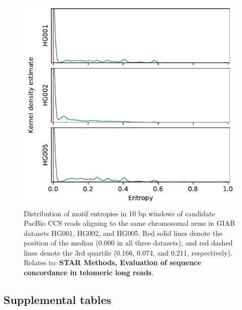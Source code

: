 \documentclass{article}
\begin{document}
\begin{figure}[ht!] \centering
\includegraphics[height=.95\textheight,width=.65\textwidth,keepaspectratio]{figures/entropy.pdf}
\caption{
    Distribution of motif entropies in 10 bp windows of candidate PacBio CCS reads aligning to the same chromosomal arms in GIAB datasets HG001, HG002, and HG005.
    Red solid lines denote the position of the median (0.000 in all three datasets), and red dashed lines denote the 3rd quartile (0.166, 0.074, and 0.211, respectively).
    Relates to: \textbf{STAR Methods, Evaluation of sequence concordance in telomeric long reads}.
}
\label{fig:entropy}
\end{figure}
\clearpage \pagebreak

\subsection*{Supplemental tables} 



\end{document}
